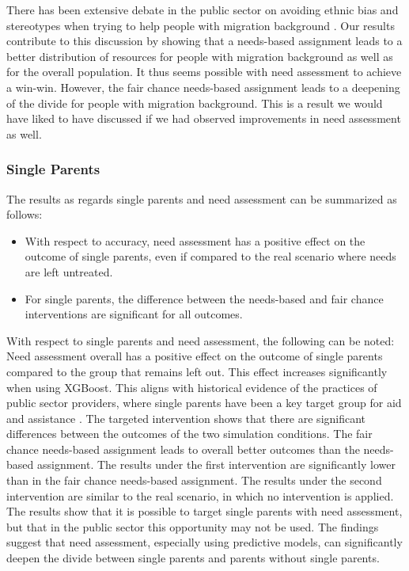 There has been extensive debate in the public sector on avoiding ethnic bias and stereotypes when trying to help people with migration background \cite{desireUsingArtificialIntelligence2021, desiere2019statistical}. Our results contribute to this discussion by showing that a needs-based assignment leads to a better distribution of resources for people with migration background as well as for the overall population. It thus seems possible with need assessment to achieve a win-win. However, the fair chance needs-based assignment leads to a deepening of the divide for people with migration background. This is a result we would have liked to have discussed if we had observed improvements in need assessment as well. 

\subsubsection{Single Parents}
\label{sec:results_singles}
The results as regards single parents and need assessment can be summarized as follows: 
\begin{itemize}
\item With respect to accuracy, need assessment has a positive effect on the outcome of single parents, even if compared to the real scenario where needs are left untreated.
\item For single parents, the difference between the needs-based and fair chance interventions are significant for all outcomes.
\end{itemize}

With respect to single parents and need assessment, the following can be noted: Need assessment overall has a positive effect on the outcome of single parents compared to the group that remains left out. This effect increases significantly when using XGBoost. This aligns with historical evidence of the practices of public sector providers, where single parents have been a key target group for aid and assistance \cite{Kallus03042021, wirtz2019artificial}. The targeted intervention shows that there are significant differences between the outcomes of the two simulation conditions. The fair chance needs-based assignment leads to overall better outcomes than the needs-based assignment. The results under the first intervention are significantly lower than in the fair chance needs-based assignment. The results under the second intervention are similar to the real scenario, in which no intervention is applied. The results show that it is possible to target single parents with need assessment, but that in the public sector this opportunity may not be used. The findings suggest that need assessment, especially using predictive models, can significantly deepen the divide between single parents and parents without single parents.

